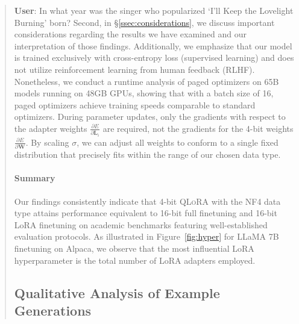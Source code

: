 \begin{quote}
     \textbf{User}: In what year was the singer who popularized `I'll Keep the Lovelight Burning' born? Second, in \S\ref{ssec:considerations}, we discuss important considerations regarding the results we have examined and our interpretation of those findings. Additionally, we emphasize that our model is trained exclusively with cross-entropy loss (supervised learning) and does not utilize reinforcement learning from human feedback (RLHF). Nonetheless, we conduct a runtime analysis of paged optimizers on 65B models running on 48GB GPUs, showing that with a batch size of 16, paged optimizers achieve training speeds comparable to standard optimizers. During parameter updates, only the gradients with respect to the adapter weights $\frac{\partial E}{\partial \mathbf{L}_i}$ are required, not the gradients for the 4-bit weights $\frac{\partial E}{\partial \mathbf{W}}$. By scaling $\sigma$, we can adjust all weights to conform to a single fixed distribution that precisely fits within the range of our chosen data type. \paragraph{Summary} Our findings consistently indicate that 4-bit \textsc{QLoRA} with the NF4 data type attains performance equivalent to 16-bit full finetuning and 16-bit LoRA finetuning on academic benchmarks featuring well-established evaluation protocols. As illustrated in Figure~\ref{fig:hyper} for LLaMA 7B finetuning on Alpaca, we observe that the most influential LoRA hyperparameter is the total number of LoRA adapters employed. \subsection{Qualitative Analysis of Example Generations}
\label{ssec:examples}


\end{quote}
